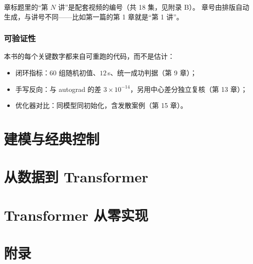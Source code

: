 \documentclass[UTF8,11pt,openany]{ctexbook}
\begin{document}
章标题里的“第 $N$ 讲”是配套视频的编号（共 18 集，见附录 B）。
章号由排版自动生成，与讲号不同——比如第一篇的第 1 章就是“第 1 讲”。

\section*{可验证性}

本书的每个关键数字都来自可重跑的代码，而不是估计：

\begin{itemize}[leftmargin=1.6em,itemsep=2pt]
  \item 闭环指标：$60$ 组随机初值、$12$\,s、统一成功判据（第 9 章）；
  \item 手写反向：与 autograd 的差 $3\times10^{-14}$，另用中心差分独立复核（第 13 章）；
  \item 优化器对比：同模型同初始化，含发散案例（第 15 章）。
\end{itemize}

\tableofcontents

\mainmatter

\part{建模与经典控制}







\part{从数据到 Transformer}





\part{Transformer 从零实现}










\appendix
\part{附录}

\end{document}
